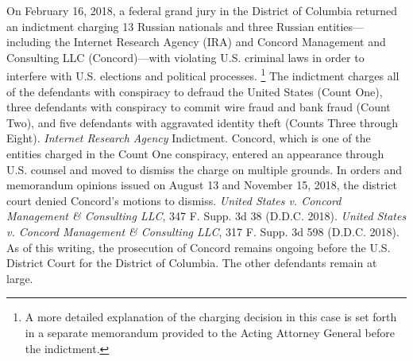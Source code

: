 On February 16, 2018, a federal grand jury in the District of Columbia returned an indictment charging 13 Russian nationals and three Russian entities---including the Internet Research Agency (IRA) and Concord Management and Consulting LLC (Concord)---with violating U.S. criminal laws in order to interfere with U.S. elections and political processes.%
\footnote{A more detailed explanation of the charging decision in this case is set forth in a separate memorandum provided to the Acting Attorney General before the indictment.}
The indictment charges all of the defendants with conspiracy to defraud the United States (Count One), three defendants with conspiracy to commit wire fraud and bank fraud (Count Two), and five defendants with aggravated identity theft (Counts Three through Eight).
\textit{Internet Research Agency} Indictment.
Concord, which is one of the entities charged in the Count One conspiracy, entered an appearance through U.S. counsel and moved to dismiss the charge on multiple grounds.
In orders and memorandum opinions issued on August 13 and November 15, 2018, the district court denied Concord's motions to dismiss.
\textit{United States v. Concord Management \& Consulting LLC}, 347 F. Supp. 3d 38 (D.D.C. 2018).
\textit{United States v. Concord Management \& Consulting LLC}, 317 F. Supp. 3d 598 (D.D.C. 2018).
As of this writing, the prosecution of Concord remains ongoing before the U.S. District Court for the District of Columbia.
The other defendants remain at large.

